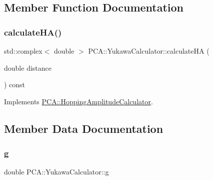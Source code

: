 \subsection{Member Function Documentation}
\hypertarget{class_p_c_a_1_1_yukawa_calculator_a543f237d55350a7669f8b85789cae68d}{}\label{class_p_c_a_1_1_yukawa_calculator_a543f237d55350a7669f8b85789cae68d} 
\subsubsection{\texorpdfstring{calculate\+H\+A()}{calculateHA()}}
{\footnotesize\ttfamily std\+::complex$<$ double $>$ P\+C\+A\+::\+Yukawa\+Calculator\+::calculate\+HA (\begin{DoxyParamCaption}\item[{double}]{distance }\end{DoxyParamCaption}) const\hspace{0.3cm}{\ttfamily [virtual]}}



Implements \hyperlink{class_p_c_a_1_1_hopping_amplitude_calculator_ae925735be8ef006f3f8dfdc1a23cae89}{P\+C\+A\+::\+Hopping\+Amplitude\+Calculator}.



\subsection{Member Data Documentation}
\hypertarget{class_p_c_a_1_1_yukawa_calculator_a9fc1cfaf2c30fdd14561238a5b114a0c}{}\label{class_p_c_a_1_1_yukawa_calculator_a9fc1cfaf2c30fdd14561238a5b114a0c} 
\subsubsection{\texorpdfstring{g}{g}}
{\footnotesize\ttfamily double P\+C\+A\+::\+Yukawa\+Calculator\+::g\hspace{0.3cm}{\ttfamily [private]}}

\hypertarget{class_p_c_a_1_1_yukawa_calculator_a4b442aa74b079ce8778e19d69c163cf6}{}\label{class_p_c_a_1_1_yukawa_calculator_a4b442aa74b079ce8778e19d69c163cf6} 
